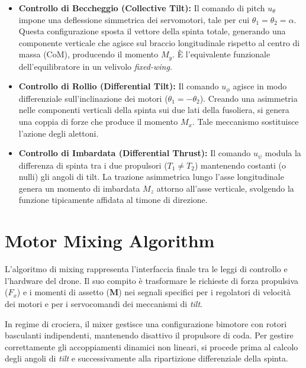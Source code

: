 \begin{itemize}
    \item \textbf{Controllo di Beccheggio (Collective Tilt):} 
    Il comando di pitch $u_\theta$ impone una deflessione simmetrica dei servomotori, tale per cui $\theta_1 = \theta_2 = \alpha$. Questa configurazione sposta il vettore della spinta totale, generando una componente verticale che agisce sul braccio longitudinale rispetto al centro di massa (CoM), producendo il momento $M_y$. È l'equivalente funzionale dell'equilibratore in un velivolo \textit{fixed-wing}.
    
    \item \textbf{Controllo di Rollio (Differential Tilt):} 
    Il comando $u_\phi$ agisce in modo differenziale sull'inclinazione dei motori ($\theta_1 = -\theta_2$). Creando una asimmetria nelle componenti verticali della spinta sui due lati della fusoliera, si genera una coppia di forze che produce il momento $M_x$. Tale meccanismo sostituisce l'azione degli alettoni.
    
    \item \textbf{Controllo di Imbardata (Differential Thrust):} 
    Il comando $u_\psi$ modula la differenza di spinta tra i due propulsori ($T_1 \neq T_2$) mantenendo costanti (o nulli) gli angoli di tilt. La trazione asimmetrica lungo l'asse longitudinale genera un momento di imbardata $M_z$ attorno all'asse verticale, svolgendo la funzione tipicamente affidata al timone di direzione.
\end{itemize}

\clearpage

\section{Motor Mixing Algorithm}
L'algoritmo di mixing rappresenta l'interfaccia finale tra le leggi di controllo e l'hardware del drone. Il suo compito è trasformare le richieste di forza propulsiva ($F_{x}$) e i momenti di assetto ($\bm{M}$) nei segnali specifici per i regolatori di velocità dei motori e per i servocomandi dei meccanismi di \textit{tilt}. 

In regime di crociera, il mixer gestisce una configurazione bimotore con rotori basculanti indipendenti, mantenendo disattivo il propulsore di coda. Per gestire correttamente gli accoppiamenti dinamici non lineari, si procede prima al calcolo degli angoli di \textit{tilt} e successivamente alla ripartizione differenziale della spinta.

